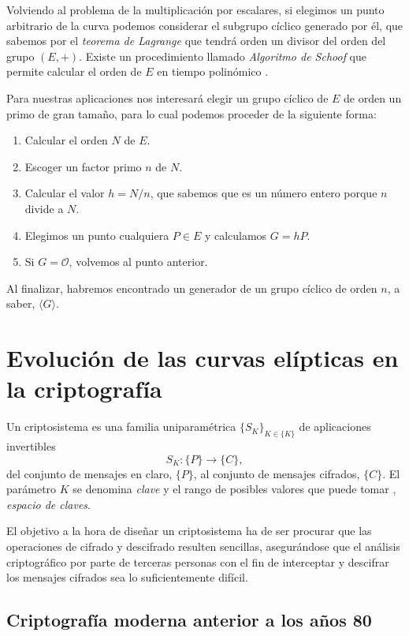 \documentclass[
  a4paper,
  12pt,
  spanish,
]{scrartcl}
\begin{document}
Volviendo al problema de la multiplicación por escalares, si elegimos un punto arbitrario de la curva podemos considerar el subgrupo cíclico generado por él, que sabemos por el \textit{teorema de Lagrange} que tendrá orden un divisor del orden del grupo $(E, +)$. Existe un procedimiento llamado \textit{Algoritmo de Schoof} que permite calcular el orden de $E$ en tiempo polinómico \parencite{schoof_points_1995}.

Para nuestras aplicaciones nos interesará elegir un grupo cíclico de $E$ de orden un primo de gran tamaño, para lo cual podemos proceder de la siguiente forma:

\begin{enumerate}
	\item Calcular el orden $N$ de $E$.
	\item Escoger un factor primo $n$ de $N$.
	\item Calcular el valor $h = N/n$, que sabemos que es un número entero porque $n$ divide a $N$.
	\item Elegimos un punto cualquiera $P \in E$ y calculamos $G = hP$.
	\item Si $G=\mathcal{O}$, volvemos al punto anterior.
\end{enumerate}

Al finalizar, habremos encontrado un generador de un grupo cíclico de orden $n$, a saber, $\langle G \rangle$.

\section{Evolución de las curvas elípticas en la criptografía}
\label{sec:historia}

Un criptosistema es una familia uniparamétrica \(\{S_K\}_{K \in \{K\}}\) de aplicaciones invertibles \[S_K: \{P\} \to \{C\},\] del conjunto de mensajes en claro, \(\{P\}\), al conjunto de mensajes cifrados, \(\{C\}\).
El parámetro \(K\) se denomina \textit{clave} y el rango de posibles valores que puede tomar
, \textit{espacio de claves}.

El objetivo a la hora de diseñar un criptosistema
 ha de ser procurar que las operaciones de cifrado y descifrado resulten sencillas, asegurándose que el análisis criptográfico por parte de terceras personas con el fin de interceptar y descifrar los mensajes cifrados sea lo suficientemente difícil.

\subsection{Criptografía moderna anterior a los años 80}
\end{document}
